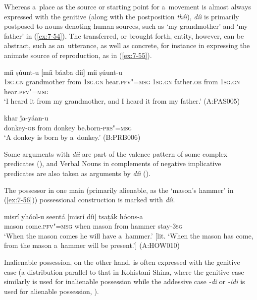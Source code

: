 Whereas a~place as the source or starting point for a~movement is almost always expressed with the genitive (along with the postposition \textit{thíi}), \textit{díi} is primarily postposed to nouns denoting human sources, such as `my grandmother' and `my father' in (\ref{ex:7-54}). The transferred, or brought forth, entity, however, can be abstract, such as an~utterance, as well as concrete, for instance in expressing the animate source of reproduction, as in (\ref{ex:7-55}).

\begin{exe}
\ex
\label{ex:7-54}
 míi ṣúunt-u [míi  báaba díi] míi
ṣúunt-u \\
\textsc{1sg.gn} grandmother from \textsc{1sg.gn} hear.\textsc{pfv"=msg} \textsc{1sg.gn} father.\textsc{ob} from \textsc{1sg.gn} hear.\textsc{pfv"=msg}\\
\glt `I heard it from my grandmother, and I heard it from my father.' (A:PAS005)

\ex
\label{ex:7-55}
 khar ǰa-yáan-u \\
donkey-\textsc{ob} from donkey be.born\textsf{-}\textsc{prs"=msg} \\
\glt `A donkey is born by a~donkey.' (B:PRB006)
\end{exe}

Some arguments with \textit{díi} are part of the valence pattern of some complex predicates (), and Verbal Nouns in complements of negative implicative predicates are also taken as arguments by \textit{díi} ().


The possessor in one main (primarily alienable, as the `mason's hammer' in (\ref{ex:7-56})) possessional construction is marked with \textit{díi}.

\begin{exe}
\ex
\label{ex:7-56}
\gll misrí yhóol-u seentá [misrí díi] tsaṭák hóons-a \\
mason come.\textsc{pfv"=msg} when mason from hammer stay-\textsc{3sg} \\
\glt `When the mason comes he will have a~hammer.' [lit. `When the mason has come, from the mason a~hammer will be present.'] (A:HOW010)
\end{exe}

Inalienable possession, on the other hand, is often expressed with the genitive case (a distribution parallel to that in Kohistani Shina, where the genitive case similarly is used for inalienable possession while the addessive case \textit{-di} or \textit{-idi} is used for alienable possession, \citealt[65, 69--70]{schmidtkohistani2008}).




